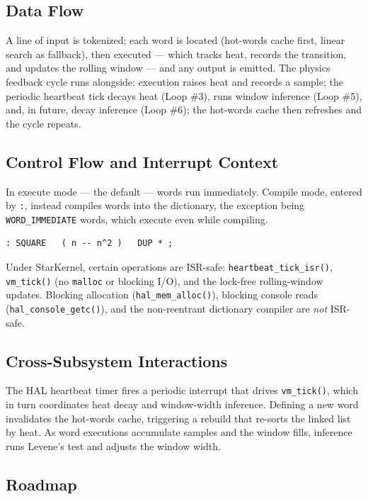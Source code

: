 \subsection{Data Flow}

A line of input is tokenized; each word is located (hot-words cache first,
linear search as fallback), then executed --- which tracks heat, records the
transition, and updates the rolling window --- and any output is emitted. The
physics feedback cycle runs alongside: execution raises heat and records a
sample; the periodic heartbeat tick decays heat (Loop \#3), runs window
inference (Loop \#5), and, in future, decay inference (Loop \#6); the hot-words
cache then refreshes and the cycle repeats.

\subsection{Control Flow and Interrupt Context}

In execute mode --- the default --- words run immediately. Compile mode, entered
by \texttt{:}, instead compiles words into the dictionary, the exception being
\texttt{WORD\_IMMEDIATE} words, which execute even while compiling.

\begin{lstlisting}[language=Forth]
: SQUARE   ( n -- n^2 )   DUP * ;
\end{lstlisting}

Under StarKernel, certain operations are ISR-safe: \texttt{heartbeat\_tick\_isr()},
\texttt{vm\_tick()} (no \texttt{malloc} or blocking I/O), and the lock-free
rolling-window updates. Blocking allocation (\texttt{hal\_mem\_alloc()}),
blocking console reads (\texttt{hal\_console\_getc()}), and the non-reentrant
dictionary compiler are \emph{not} ISR-safe.

\subsection{Cross-Subsystem Interactions}

The HAL heartbeat timer fires a periodic interrupt that drives
\texttt{vm\_tick()}, which in turn coordinates heat decay and window-width
inference. Defining a new word invalidates the hot-words cache, triggering a
rebuild that re-sorts the linked list by heat. As word executions accumulate
samples and the window fills, inference runs Levene's test and adjusts the
window width.

\subsection{Roadmap}

